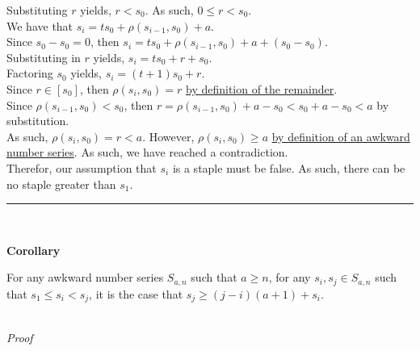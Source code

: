 \documentclass[a4paper,12pt]{article}
\begin{document}
\noindent Substituting $r$ yields, $r < s_0$. As such, $0 \leq r < s_0$.\\

\noindent We have that $s_i = ts_0 + \rho(s_{i - 1}, s_0) + a$.\\

\noindent Since $s_0 - s_0 = 0$, then $s_i = ts_0 + \rho(s_{i - 1}, s_0) + a + (s_0 - s_0)$.\\

\noindent Substituting in $r$ yields, $s_i = ts_0 + r + s_0$.\\

\noindent Factoring $s_0$ yields, $s_i = (t + 1)s_0 + r$.\\

\noindent Since $r \in [s_0]$, then $\rho(s_i, s_0) = r$ \hyperlink{theorem:remainder_theorem}{by definition of the remainder}.\\

\noindent Since $\rho(s_{i - 1}, s_0) < s_0$, then $r = \rho(s_{i - 1}, s_0) + a - s_0 < s_0 + a - s_0 < a$ by substitution.\\

\noindent As such, $\rho(s_i, s_0) = r < a$. However, $\rho(s_i, s_0) \geq a$ \hyperlink{definition:awkward_number_series}{by definition of an awkward number series}. As such, we have reached a contradiction.\\

\noindent Therefor, our assumption that $s_i$ is a staple must be false. As such, there can be no staple greater than $s_1$.


\begin{center}
\noindent\rule{8cm}{0.4pt}
\end{center}
\noindent \\







\label{corollary:min_length_one_staple}
\hypertarget{corollary:min_length_one_staple}{}
\begin{tcolorbox}
\textbf{Corollary}

\noindent For any awkward number series $S_{a,n}$ such that $a \geq n$, for any $s_i, s_j \in S_{a, n}$ such that $s_1 \leq s_i < s_j$, it is the case that $s_j \geq (j - i)(a + 1) + s_i$.

\end{tcolorbox}

\noindent \\
\textit{Proof}
\end{document}
